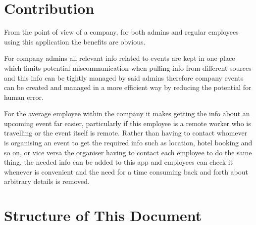 \section{Contribution} \label{contribution}

From the point of view of a company, for both admins and regular employees using this application the benefits are obvious. 

For company admins all relevant info related to events are kept in one place which limits potential miscommunication when pulling info from different sources and this info can be tightly managed by said admins therefore company events can be created and managed in a more efficient way by reducing the potential for human error.

For the average employee within the company it makes getting the info about an upcoming event far easier, particularly if this employee is a remote worker who is travelling or the event itself is remote. Rather than having to contact whomever is organising an event to get the required info such as location, hotel booking and so on, or vice versa the organiser having to contact each employee to do the same thing, the needed info can be added to this app and employees can check it whenever is convenient and the need for a time consuming back and forth about arbitrary details is removed.

\section{Structure of This Document} \label{docstructure}

